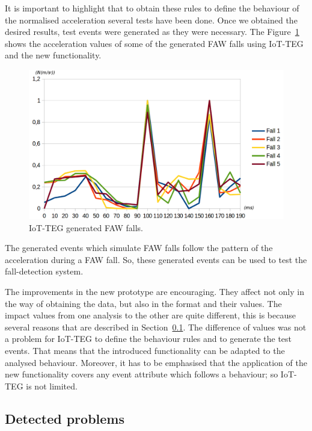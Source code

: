 \documentclass[journal]{IEEEtran}
\begin{document}
It is important to highlight that to obtain these rules to define the behaviour of the normalised acceleration several tests
have been done. Once we obtained the desired results, test events were generated as they were necessary. The 
Figure~\ref{fig:IoTTEGFAWGeneratedEvents} shows the acceleration values of some of the generated FAW falls using
IoT-TEG and the new functionality.

\begin{figure}[!ht]
  \centering
  \includegraphics[scale=0.2]{img/IoTTEGFAWGeneratedEvents}
  \caption[IoT-TEG generated FAW falls]{IoT-TEG generated FAW falls.}
  \label{fig:IoTTEGFAWGeneratedEvents}
\end{figure}

The generated events which simulate FAW falls follow the pattern of the acceleration during a FAW fall.
So, these generated events can be used to test the fall-detection system.

The improvements in the new prototype are encouraging. They affect not only in the way of obtaining the data, but 
also in the format and their values. The impact values from one analysis to the other are quite different, 
this is because several reasons that are described in Section~\ref{sub:detectedproblems}. The difference
of values was not a problem for IoT-TEG to define the behaviour rules and to generate the test events. That
means that the introduced functionality can be adapted to the analysed
behaviour. Moreover, it has to be emphasised that the application of the new functionality covers any event attribute which follows a behaviour;
so IoT-TEG is not limited.

\subsection{Detected problems}
\label{sub:detectedproblems}
\end{document}
